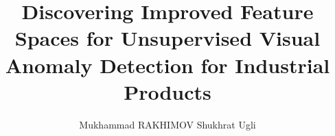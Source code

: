 \title{Discovering Improved Feature Spaces for Unsupervised Visual Anomaly Detection for Industrial Products}
\author{Mukhammad RAKHIMOV Shukhrat Ugli}
\maketitle